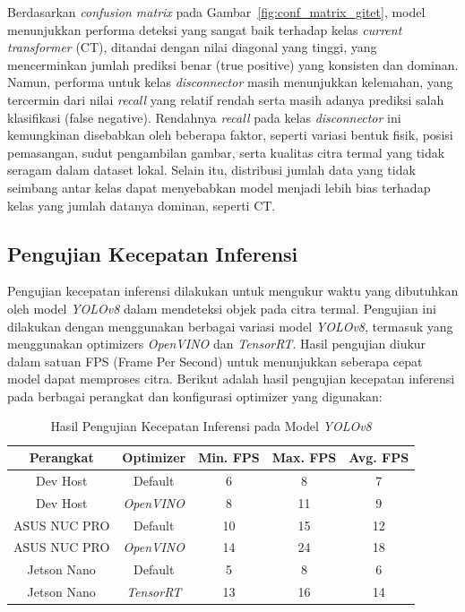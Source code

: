 Berdasarkan \emph{confusion matrix} pada Gambar~\ref{fig:conf_matrix_gitet}, model menunjukkan performa deteksi yang sangat baik terhadap kelas \emph{current transformer} (CT), ditandai dengan nilai diagonal yang tinggi, yang mencerminkan jumlah prediksi benar (true positive) yang konsisten dan dominan. Namun, performa untuk kelas \emph{disconnector} masih menunjukkan kelemahan, yang tercermin dari nilai \emph{recall} yang relatif rendah serta masih adanya prediksi salah klasifikasi (false negative). Rendahnya \emph{recall} pada kelas \emph{disconnector} ini kemungkinan disebabkan oleh beberapa faktor, seperti variasi bentuk fisik, posisi pemasangan, sudut pengambilan gambar, serta kualitas citra termal yang tidak seragam dalam dataset lokal. Selain itu, distribusi jumlah data yang tidak seimbang antar kelas dapat menyebabkan model menjadi lebih bias terhadap kelas yang jumlah datanya dominan, seperti CT.

\subsection{Pengujian Kecepatan Inferensi}
Pengujian kecepatan inferensi dilakukan untuk mengukur waktu yang dibutuhkan oleh model \emph{YOLOv8} dalam mendeteksi objek pada citra termal. Pengujian ini dilakukan dengan menggunakan berbagai variasi model \emph{YOLOv8}, termasuk yang menggunakan optimizers \emph{OpenVINO} dan \emph{TensorRT}. Hasil pengujian diukur dalam satuan FPS (Frame Per Second) untuk menunjukkan seberapa cepat model dapat memproses citra. Berikut adalah hasil pengujian kecepatan inferensi pada berbagai perangkat dan konfigurasi optimizer yang digunakan:

\begin{table}[H]
	\centering
	\caption{Hasil Pengujian Kecepatan Inferensi pada Model \emph{YOLOv8}}
	\label{tab:kecepatan_inferensi}
	\begin{tabular}{|c|c|c|c|c|}
		\hline
		\textbf{Perangkat} & \textbf{Optimizer} & \textbf{Min. FPS} & \textbf{Max. FPS} & \textbf{Avg. FPS} \\
		\hline
		Dev Host           & Default            & 6                 & 8                 & 7                 \\
		Dev Host           & \emph{OpenVINO}    & 8                 & 11                & 9                 \\
		ASUS NUC PRO       & Default            & 10                & 15                & 12                \\
		ASUS NUC PRO       & \emph{OpenVINO}    & 14                & 24                & 18                \\
		Jetson Nano        & Default            & 5                 & 8                 & 6                 \\
		Jetson Nano        & \emph{TensorRT}    & 13                & 16                & 14                \\
		\hline
	\end{tabular}
\end{table}

